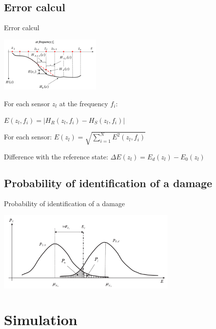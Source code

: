 \documentclass{beamer}
\begin{document}
\subsection{Error calcul}
\begin{frame}{Error calcul}

\begin{center}
\includegraphics[width=5cm]{images/interpolation.png}
\end{center}

For each sensor $z_l$ at the frequency $f_i$:
\begin{center}
$E(z_l,f_i) = | H_R(z_l,f_i) - H_S(z_l,f_i) |$
\end{center}


For each sensor:
$E(z_l) = \sqrt{  \sum\limits_{i=1}^N  E^2(z_l,f_i) }$


Difference with the reference state:
$\Delta E(z_l) = E_d(z_l) - E_0(z_l)$

\end{frame}

\subsection{Probability of identification of a damage}
\begin{frame}{Probability of identification of a damage}
\begin{center}
\includegraphics[height=4cm]{images/gaussiennes.png}
\end{center}
\end{frame}


\section{Simulation}
\end{document}
